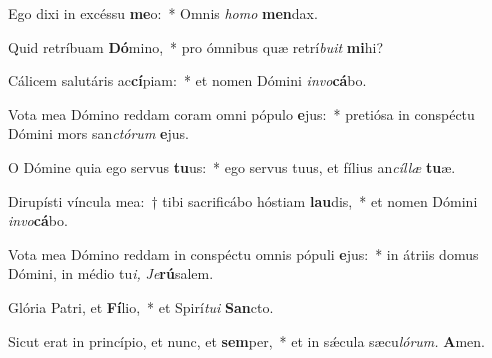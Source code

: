 \item Ego dixi in excéssu \textbf{me}o:~* Omnis \textit{homo} \textbf{men}dax.
\item Quid retríbuam \textbf{Dó}mino,~* pro ómnibus quæ retrí\textit{buit} \textbf{mi}hi?
\item Cálicem salutáris ac\textbf{cí}piam:~* et nomen Dómini \textit{invo}\textbf{cá}bo.
\item Vota mea Dómino reddam coram omni pópulo \textbf{e}jus:~* pretiósa in conspé\-ctu Dómini mors san\textit{ctórum} \textbf{e}jus.
\item O Dómine quia ego servus \textbf{tu}us:~* ego servus tuus, et fílius an\textit{cíllæ} \textbf{tu}æ.
\item Dirupísti víncula mea:~† tibi sacrificábo hóstiam \textbf{lau}dis,~* et nomen Dómini \textit{invo}\textbf{cá}bo.
\item Vota mea Dómino reddam in conspéctu omnis pópuli \textbf{e}jus:~* in átriis domus Dómini, in médio tu\tinyhspace\textit{i,} \hspace*{0.02em}\textit{Je}\textbf{rú}salem.
\item Glória Patri, et \textbf{Fí}lio,~* et Spirí\tinyhspace\textit{tui} \textbf{San}cto.
\item Sicut erat in princípio, et nunc, et \textbf{sem}per,~* et in sǽcula sæcu\tinyhspace\textit{lórum.} \textbf{A}men.
